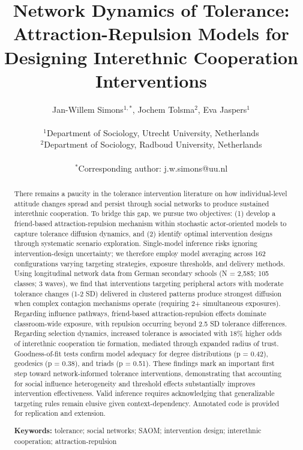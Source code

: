 \documentclass[12pt,a4paper]{article}
\title{Network Dynamics of Tolerance: Attraction-Repulsion Models for Designing Interethnic Cooperation Interventions}
\author{
Jan-Willem Simons$^{1,*}$, Jochem Tolsma$^{2}$, Eva Jaspers$^{1}$ \\
\\
$^{1}$Department of Sociology, Utrecht University, Netherlands\\
$^{2}$Department of Sociology, Radboud University, Netherlands\\
\\
$^{*}$Corresponding author: j.w.simons@uu.nl
}
\date{}
\begin{document}
\maketitle


\begin{abstract}
\noindent
There remains a paucity in the tolerance intervention literature on how individual-level attitude changes spread and persist through social networks to produce sustained interethnic cooperation. To bridge this gap, we pursue two objectives: (1) develop a friend-based attraction-repulsion mechanism within stochastic actor-oriented models to capture tolerance diffusion dynamics, and (2) identify optimal intervention designs through systematic scenario exploration. Single-model inference risks ignoring intervention-design uncertainty; we therefore employ model averaging across 162 configurations varying targeting strategies, exposure thresholds, and delivery methods. Using longitudinal network data from German secondary schools (N = 2,585; 105 classes; 3 waves), we find that interventions targeting peripheral actors with moderate tolerance changes (1-2 SD) delivered in clustered patterns produce strongest diffusion when complex contagion mechanisms operate (requiring 2+ simultaneous exposures). Regarding influence pathways, friend-based attraction-repulsion effects dominate classroom-wide exposure, with repulsion occurring beyond 2.5 SD tolerance differences. Regarding selection dynamics, increased tolerance is associated with 18\% higher odds of interethnic cooperation tie formation, mediated through expanded radius of trust. Goodness-of-fit tests confirm model adequacy for degree distributions (p = 0.42), geodesics (p = 0.38), and triads (p = 0.51). These findings mark an important first step toward network-informed tolerance interventions, demonstrating that accounting for social influence heterogeneity and threshold effects substantially improves intervention effectiveness. Valid inference requires acknowledging that generalizable targeting rules remain elusive given context-dependency. Annotated code is provided for replication and extension.

\textbf{Keywords:} tolerance; social networks; SAOM; intervention design; interethnic cooperation; attraction-repulsion
\end{abstract}
\end{document}
